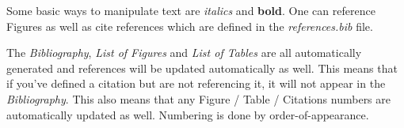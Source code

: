 Some basic ways to manipulate text are \textit{italics} and \textbf{bold}. One can reference Figures as well as cite references which are defined in the \textit{references.bib} file.\cite{spectre,example-reference} 

The \textit{Bibliography}, \textit{List of Figures} and \textit{List of Tables} are all automatically generated and references will be updated automatically as well. This means that if you've defined a citation but are not referencing it, it will not appear in the \textit{Bibliography}. This also means that any Figure / Table / Citations numbers are automatically updated as well. Numbering is done by order-of-appearance.
